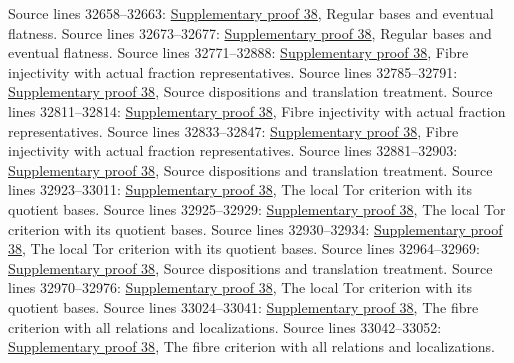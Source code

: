 \begin{AlgebraSourceRoutes}
 Source lines 32658--32663: \hyperlink{algebra_more_flatness_notes_20260928}{Supplementary proof 38}, Regular bases and eventual flatness.
 Source lines 32673--32677: \hyperlink{algebra_more_flatness_notes_20260928}{Supplementary proof 38}, Regular bases and eventual flatness.
 Source lines 32771--32888: \hyperlink{algebra_more_flatness_notes_20260928}{Supplementary proof 38}, Fibre injectivity with actual fraction representatives.
 Source lines 32785--32791: \hyperlink{algebra_more_flatness_notes_20260928}{Supplementary proof 38}, Source dispositions and translation treatment.
 Source lines 32811--32814: \hyperlink{algebra_more_flatness_notes_20260928}{Supplementary proof 38}, Fibre injectivity with actual fraction representatives.
 Source lines 32833--32847: \hyperlink{algebra_more_flatness_notes_20260928}{Supplementary proof 38}, Fibre injectivity with actual fraction representatives.
 Source lines 32881--32903: \hyperlink{algebra_more_flatness_notes_20260928}{Supplementary proof 38}, Source dispositions and translation treatment.
 Source lines 32923--33011: \hyperlink{algebra_more_flatness_notes_20260928}{Supplementary proof 38}, The local Tor criterion with its quotient bases.
 Source lines 32925--32929: \hyperlink{algebra_more_flatness_notes_20260928}{Supplementary proof 38}, The local Tor criterion with its quotient bases.
 Source lines 32930--32934: \hyperlink{algebra_more_flatness_notes_20260928}{Supplementary proof 38}, The local Tor criterion with its quotient bases.
 Source lines 32964--32969: \hyperlink{algebra_more_flatness_notes_20260928}{Supplementary proof 38}, Source dispositions and translation treatment.
 Source lines 32970--32976: \hyperlink{algebra_more_flatness_notes_20260928}{Supplementary proof 38}, The local Tor criterion with its quotient bases.
 Source lines 33024--33041: \hyperlink{algebra_more_flatness_notes_20260928}{Supplementary proof 38}, The fibre criterion with all relations and localizations.
 Source lines 33042--33052: \hyperlink{algebra_more_flatness_notes_20260928}{Supplementary proof 38}, The fibre criterion with all relations and localizations.

\end{AlgebraSourceRoutes}
